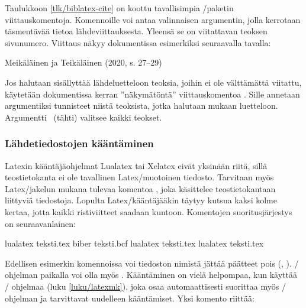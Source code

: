 Taulukkoon \ref{tlk/biblatex-cite} on koottu tavallisimpia
\-/paketin viittauskomentoja. Komennoille voi antaa
valinnaisen argumentin, jolla kerrotaan täsmentävää tietoa
lähdeviittauksesta. Yleensä se on viitattavan teoksen sivunumero.
Viittaus näkyy dokumentissa esimerkiksi seuraavalla tavalla:

\begin{koodilohkosis}
\textcite[27--29]{johdatus} %
\end{koodilohkosis}

\begin{tulossis}
  Meikäläinen ja Teikäläinen (2020, s. 27--29)
\end{tulossis}

Jos halutaan sisällyttää lähdeluetteloon teoksia, joihin ei ole
välttämättä viitattu, käytetään dokumentissa kerran ''näkymätöntä''
viittauskomentoa . Sille annetaan argumentiksi
tunnisteet niistä teoksista, jotka halutaan mukaan luetteloon.
Argumentti~\koodi{*} (tähti) valitsee kaikki teokset.

\begin{koodilohkosis}
\nocite{meikäläinen, teikäläinen} %
\nocite{*}                        %
\end{koodilohkosis}

\subsubsection{Lähdetiedostojen kääntäminen}

Latexin kääntäjäohjelmat Lualatex tai Xelatex eivät yksinään riitä,
sillä teostietokanta ei ole tavallinen Latex\-/muotoinen tiedosto.
Tarvitaan myös Latex\-/jakelun mukana tulevaa komentoa ,
joka käsittelee teostietokantaan liittyviä tiedostoja. Lopulta
Latex\-/kääntäjääkin täytyy kutsua kaksi kolme kertaa, jotta kaikki
ristiviitteet saadaan kuntoon. Komentojen suoritusjärjestys on
seuraavanlainen:

\begin{koodilohkosis}
lualatex teksti.tex
biber teksti.bcf
lualatex teksti.tex
lualatex teksti.tex
\end{koodilohkosis}

Edellisen esimerkin komennoissa voi tiedoston nimistä jättää päätteet
pois (, ). \-/ ohjelman paikalla
voi olla myös . Kääntäminen on vielä helpompaa, kun
käyttää \-/ ohjelmaa (luku \ref{luku/latexmk}), joka osaa
automaattisesti suorittaa myös \-/ ohjelman ja tarvittavat
uudelleen kääntämiset. Yksi komento riittää:

